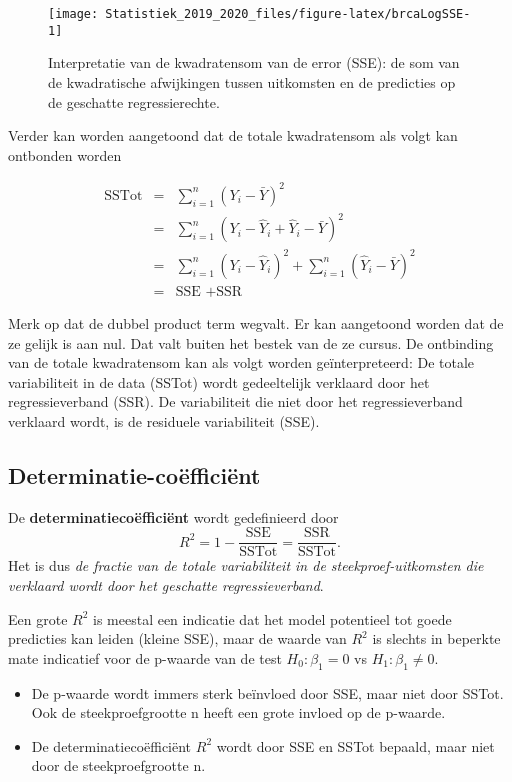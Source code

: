 \documentclass[12pt,dutch,coursenotes]{book}
\providecommand{\tightlist}{%
  \setlength{\itemsep}{0pt}\setlength{\parskip}{0pt}}
\theoremstyle{definition}
\theoremstyle{definition}
\theoremstyle{definition}
\theoremstyle{remark}
\begin{document}
\begin{figure}

{\centering \texttt{[image: Statistiek\_2019\_2020\_files/figure-latex/brcaLogSSE-1]} 

}

\caption{Interpretatie van de kwadratensom van de error (SSE): de som van de kwadratische afwijkingen tussen uitkomsten en de predicties op de geschatte regressierechte.}\label{fig:brcaLogSSE}
\end{figure}

Verder kan worden aangetoond dat de totale kwadratensom als volgt kan
ontbonden worden

\begin{eqnarray*}
  \text{SSTot} 
    &=&  \sum_{i=1}^n (Y_i-\bar{Y})^2 \\
    &=&  \sum_{i=1}^n (Y_i-\hat{Y}_i+\hat{Y}_i-\bar{Y})^2 \\
    &=&  \sum_{i=1}^n (Y_i-\hat{Y}_i)^2+\sum_{i=1}^n(\hat{Y}_i-\bar{Y})^2 \\
    &=&  \text{SSE }+\text{SSR}  
  \end{eqnarray*}

Merk op dat de dubbel product term wegvalt. Er kan aangetoond worden dat
de ze gelijk is aan nul. Dat valt buiten het bestek van de ze cursus. De
ontbinding van de totale kwadratensom kan als volgt worden
geïnterpreteerd: De totale variabiliteit in de data (SSTot) wordt
gedeeltelijk verklaard door het regressieverband (SSR). De variabiliteit
die niet door het regressieverband verklaard wordt, is de residuele
variabiliteit (SSE).

\subsection{Determinatie-coëfficiënt}\label{determinatie-coefficient}

De \textbf{determinatiecoëfficiënt} wordt gedefinieerd door
\[ R^2 = 1-\frac{\text{SSE}}{\text{SSTot}}=\frac{\text{SSR}}{\text{SSTot}}.\]
Het is dus \emph{de fractie van de totale variabiliteit in de
steekproef-uitkomsten die verklaard wordt door het geschatte
regressieverband}.

Een grote \(R^2\) is meestal een indicatie dat het model potentieel tot
goede predicties kan leiden (kleine SSE), maar de waarde van \(R^2\) is
slechts in beperkte mate indicatief voor de p-waarde van de test
\(H_0:\beta_1=0\) vs \(H_1:\beta_1\neq0\).

\begin{itemize}
\tightlist
\item
  De p-waarde wordt immers sterk beïnvloed door SSE, maar niet door
  SSTot. Ook de steekproefgrootte n heeft een grote invloed op de
  p-waarde.
\item
  De determinatiecoëfficiënt \(R^2\) wordt door SSE en SSTot bepaald,
  maar niet door de steekproefgrootte n.
\end{itemize}
\end{document}
